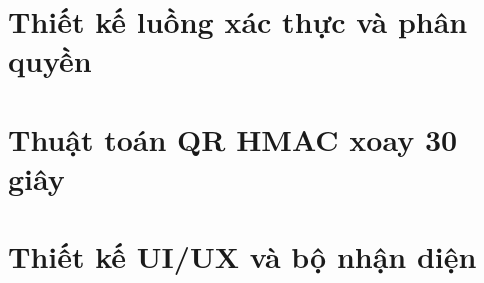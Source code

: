 \section{Thiết kế luồng xác thực và phân quyền}
\label{sec:auth-design}

\section{Thuật toán QR HMAC xoay 30 giây}
\label{sec:hmac-rotating}

\section{Thiết kế UI/UX và bộ nhận diện}
\label{sec:ui-design}

